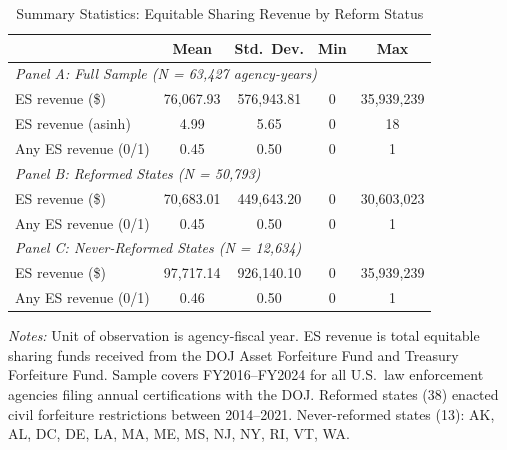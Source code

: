 \begin{table}[H]
\centering
\caption{Summary Statistics: Equitable Sharing Revenue by Reform Status}
\label{tab:summary}
\begin{threeparttable}
\begin{tabular}{lcccc}
\toprule
 & Mean & Std.\ Dev. & Min & Max \\
\midrule
\multicolumn{5}{l}{\textit{Panel A: Full Sample (N = 63,427 agency-years)}} \\
ES revenue (\$)                               & 76,067.93 & 576,943.81 & 0 & 35,939,239 \\
ES revenue (asinh)                            & 4.99 & 5.65 & 0 & 18 \\
Any ES revenue (0/1)                          & 0.45 & 0.50 & 0 & 1 \\
\midrule
\multicolumn{5}{l}{\textit{Panel B: Reformed States (N = 50,793)}} \\
ES revenue (\$)                               & 70,683.01 & 449,643.20 & 0 & 30,603,023 \\
Any ES revenue (0/1)                          & 0.45 & 0.50 & 0 & 1 \\
\midrule
\multicolumn{5}{l}{\textit{Panel C: Never-Reformed States (N = 12,634)}} \\
ES revenue (\$)                               & 97,717.14 & 926,140.10 & 0 & 35,939,239 \\
Any ES revenue (0/1)                          & 0.46 & 0.50 & 0 & 1 \\
\bottomrule
\end{tabular}
\begin{tablenotes}[flushleft]
\small
\item \textit{Notes:} Unit of observation is agency-fiscal year. ES revenue is total equitable sharing funds received from the DOJ Asset Forfeiture Fund and Treasury Forfeiture Fund. Sample covers FY2016--FY2024 for all U.S.\ law enforcement agencies filing annual certifications with the DOJ. Reformed states (38) enacted civil forfeiture restrictions between 2014--2021. Never-reformed states (13): AK, AL, DC, DE, LA, MA, ME, MS, NJ, NY, RI, VT, WA.
\end{tablenotes}
\end{threeparttable}
\end{table}
